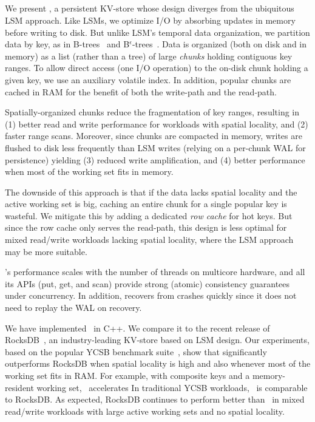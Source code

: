 \subsection{\sys} 
We present \sys, a persistent KV-store whose design diverges from the ubiquitous LSM approach.  
Like  LSMs,  we optimize I/O by absorbing updates in memory before writing to disk. 
But unlike LSM's temporal data organization, we partition data by key, as in B-trees~\cite{Comer79} and B$^\epsilon$-trees~\cite{Bender15}. 
Data is  organized (both on disk and in memory) as a list (rather than a tree) 
of large \emph{chunks} holding contiguous key ranges.
To allow direct access (one I/O operation) to the on-disk chunk holding a given key, we use an auxiliary volatile index.  
In addition, popular chunks are cached in RAM for the benefit of  both the write-path and the read-path.

Spatially-organized chunks reduce the fragmentation of key ranges, resulting in 
(1) better read and write performance for workloads with spatial locality,  and
(2) faster range scans. 
Moreover, since chunks  are compacted in memory, writes are 
flushed to disk less frequently than LSM writes (relying on a per-chunk WAL for persistence)
yielding 
(3) reduced write amplification, and 
(4) better performance when most of the working set fits in memory.

The downside of this approach is that if the data lacks spatial locality and the active working set is big, 
caching an entire chunk for a single popular key is wasteful. We mitigate this  by adding 
a dedicated \emph{row cache} for hot keys. But since the row cache only serves the read-path, 
this design is less optimal for mixed read/write workloads lacking spatial locality,
where the LSM approach may be more suitable.  

\sys's performance scales with the number of threads on multicore hardware, 
and all its APIs (put, get, and scan) provide strong (atomic) consistency guarantees 
under concurrency. 
In addition, \sys\/ recovers from crashes quickly since it does not need to replay the WAL on recovery.

We have implemented \sys\ in C++. We compare it to the recent release of RocksDB~\cite{RocksDB}, 
an industry-leading KV-store  based on LSM design. Our experiments, based on the popular 
YCSB benchmark suite~\cite{YCSB}, show that \sys\/ significantly outperforms  RocksDB 
 when spatial  locality is high and also whenever most of the working set fits in RAM. 
For example, with composite keys and a memory-resident working set, \sys\  accelerates 
 In traditional YCSB workloads,  \sys\ is comparable to RocksDB. 
As expected, 
RocksDB continues to perform better than \sys\ in mixed read/write workloads with large active working sets and no spatial locality.  

